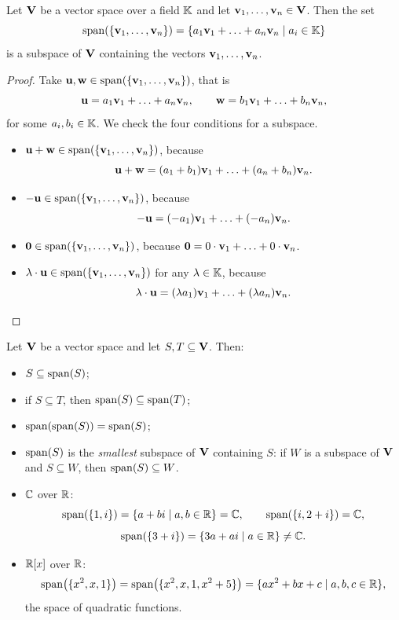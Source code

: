 \begin{theorem}
Let $\V$ be a vector space over a field $\K$ and let $\vv_1,\ldots,\vv_n\in \V$. Then the set
\[
\Span{\{\vv_1,\ldots,\vv_n\}} = \{a_1\vv_1+\ldots + a_n\vv_n\mid a_i\in \K\}
\]
is a subspace of $\V$ containing the vectors $\vv_1,\ldots,\vv_n$.
\end{theorem}

\begin{proof}
Take $\uu,\ww\in \Span{\{\vv_1,\ldots,\vv_n\}}$, that is
\[
\uu = a_1\vv_1+\ldots + a_n\vv_n, \qquad \ww = b_1\vv_1+\ldots + b_n\vv_n,
\]
for some $a_i,b_i\in \K$. We check the four conditions for a subspace.
\begin{itemize}
\item $\uu+\ww\in \Span{\{\vv_1,\ldots,\vv_n\}}$, because
\[
\uu+\ww = (a_1+b_1)\vv_1+\ldots + (a_n+b_n)\vv_n.
\]
\item $-\uu\in \Span{\{\vv_1,\ldots,\vv_n\}}$, because
\[
-\uu = (-a_1)\vv_1+\ldots + (-a_n)\vv_n.
\]
\item $\0\in \Span{\{\vv_1,\ldots,\vv_n\}}$, because $\0 = 0\cdot\vv_1+\ldots + 0\cdot \vv_n$.
\item $\lambda\cdot\uu\in \Span{\{\vv_1,\ldots,\vv_n\}}$ for any $\lambda\in\K$, because
\[
\lambda\cdot \uu = (\lambda a_1)\vv_1+\ldots + (\lambda a_n)\vv_n. \qedhere
\]
\end{itemize}
\end{proof}

\begin{fact}
Let $\V$ be a vector space and let $S,T\subseteq \V$. Then:
\begin{itemize}
\item $S\subseteq \Span{S}$;
\item if $S\subseteq T$, then $\Span{S}\subseteq \Span{T}$;
\item $\Span{\Span{S}} = \Span{S}$;
\item $\Span{S}$ is the \emph{smallest} subspace of $\V$ containing $S$: if $W$ is a subspace of $\V$ and
$S\subseteq W$, then $\Span{S}\subseteq W$.
\end{itemize}
\end{fact}

\begin{example}
\hfill
\begin{itemize}
\item $\C$ over $\R$:
\[
\Span{\{1,i\}} = \{a+bi\mid a,b\in \R\} = \C, \qquad \Span{\{i,2+i\}} = \C,
\]
\[
\Span{\{3+i\}} = \{3a+ai\mid a\in \R\} \neq \C.
\]
\item $\R[x]$ over $\R$:
\[
\Span{\{x^2,x,1\}} = \Span{\{x^2,x,1,x^2+5\}} = \{ax^2+bx+c\mid a,b,c\in \R\},
\]
the space of quadratic functions.
\end{itemize}
\end{example}

